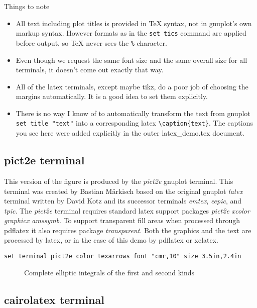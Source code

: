 \documentclass[letterpaper,11pt]{article}
\newcommand{\gpinsetfigure}[2]{
  \begin{figure}[H]
  \centering
  
  \caption{#2}
  \end{figure}
}
\begin{document}
\noindent
Things to note
\begin{itemize}
\item{All text including plot titles is provided in {\TeX} syntax, not in
      gnuplot's own markup syntax. However formats as in the {\tt set tics}
      command are applied before output, so {\TeX} never sees the
      {\tt \%} character.}
\item{Even though we request the same font size and the same overall size
      for all terminals, it doesn't come out exactly that way.}
\item{All of the latex terminals, except maybe tikz, do a poor job of choosing
      the margins automatically.  It is a good idea to set them explicitly.}
\item{There is no way I know of to automatically transform the text from
      gnuplot {\tt set title "text"}
      into a corresponding latex {\tt \verb+\caption{text}+}.}
      The captions you see here were added explicitly in the outer
      latex\_demo.tex document.
\end{itemize}

\newpage

\subsection*{pict2e terminal}

This version of the figure is produced by the {\em pict2e} gnuplot terminal.
This terminal was created by Bastian Märkisch based on the original gnuplot
{\em latex} terminal written by David Kotz and its successor terminals
{\em emtex}, {\em eepic}, and {\em tpic}.
The {\em pict2e} terminal requires standard latex support packages
{\em pict2e xcolor graphicx amssymb}.  To support transparent fill areas
when processed through pdflatex it also requires package {\em transparent}.
Both the graphics and the text are processed by latex, or in the case of this
demo by pdflatex or xelatex.

\begin{verbatim}
set terminal pict2e color texarrows font "cmr,10" size 3.5in,2.4in
\end{verbatim}
\gpinsetfigure{latex_pict2e}
              {Complete elliptic integrals of the first and second kinds}



\subsection*{cairolatex terminal}
\end{document}
